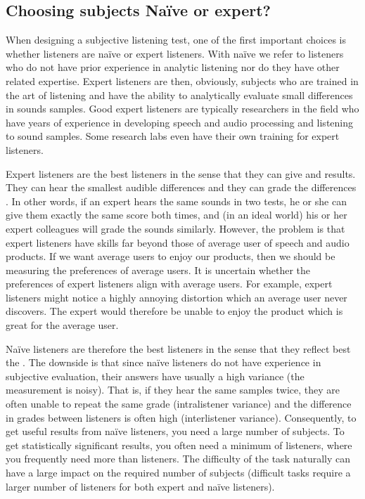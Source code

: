 \documentclass[letterpaper,10pt,english]{jupyterBook}
\begin{document}
\subsection{Choosing subjects \sphinxhyphen{} Naïve or expert?}
\label{\detokenize{Evaluation/Subjective_quality_evaluation:choosing-subjects-naive-or-expert}}
\sphinxAtStartPar
When designing a subjective listening test, one of the first important
choices is whether listeners are naïve or expert listeners. With naïve
we refer to listeners who do not have prior experience in analytic
listening nor do they have other related expertise. Expert listeners are
then, obviously, subjects who are trained in the art of listening and
have the ability to analytically evaluate small differences in sounds
samples. Good expert listeners are typically researchers in the field
who have years of experience in developing speech and audio processing
and listening to sound samples. Some research labs even have their own
training for expert listeners.

\sphinxAtStartPar
Expert listeners are the best listeners in the sense that they can give
 and  results. They can hear the smallest audible
differences and they can grade the differences . In other
words, if an expert hears the same sounds in two tests, he or she can
give them exactly the same score both times, and (in an ideal world) his
or her expert colleagues will grade the sounds similarly. However, the
problem is that expert listeners have skills far beyond those of average
user of speech and audio products. If we want average users to enjoy our
products, then we should be measuring the preferences of average users.
It is uncertain whether the preferences of expert listeners align with
average users. For example, expert listeners might notice a highly
annoying distortion which an average user never discovers. The expert
would therefore be unable to enjoy the product which is great for the
average user.

\sphinxAtStartPar
Naïve listeners are therefore the best listeners in the sense that they
reflect best the . The downside
is that since naïve listeners do not have experience in subjective
evaluation, their answers have usually a high variance (the measurement
is noisy). That is, if they hear the same samples twice, they are often
unable to repeat the same grade (intra\sphinxhyphen{}listener variance) and the
difference in grades between listeners is often high (inter\sphinxhyphen{}listener
variance). Consequently, to get useful results from naïve listeners, you
need a large number of subjects. To get statistically significant
results, you often need a minimum of  listeners, where you
frequently need more than  listeners. The difficulty of the
task naturally can have a large impact on the required number of
subjects (difficult tasks require a larger number of listeners for both
expert and naïve listeners).
\end{document}
